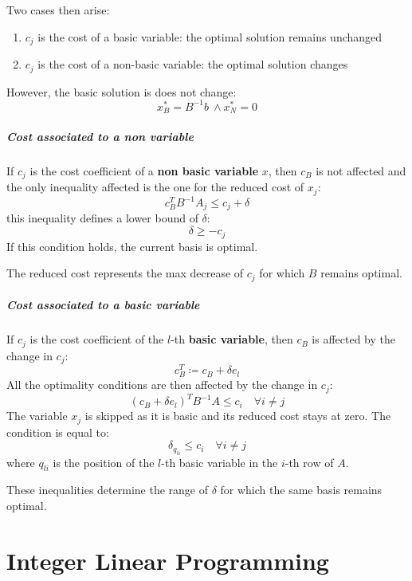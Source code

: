 \documentclass[english]{article}
\begin{document}
Two cases then arise:

\begin{enumerate}
  \item \(c_j\) is the cost of a basic variable: the optimal solution remains unchanged
  \item \(c_j\) is the cost of a non-basic variable: the optimal solution changes
\end{enumerate}

However, the basic solution is does not change:
\[ x_B^\ast = B^{-1} b \ \land x_N^\ast = 0 \]

\subparagraph*{Cost associated to a non variable}
If \(c_j\) is the cost coefficient of a \textbf{non basic variable} \(x\), then \(c_B\) is not affected and the only inequality affected is the one for the reduced cost of \(x_j\):
\[ c^T_B B^{-1} A_j \leq c_j + \delta \]
this inequality defines a lower bound of \(\delta\):
\[ \delta \geq - c_j \]
If this condition holds, the current basis is optimal.

The reduced cost represents the max decrease of \(c_j\) for which \(B\) remains optimal.

\subparagraph*{Cost associated to a basic variable}
If \(c_j\) is the cost coefficient of the \(l\)-th \textbf{basic variable}, then \(c_B\) is affected by the change in \(c_j\):
\[ c^T_B \coloneqq c_B + \delta  e_l \]
All the optimality conditions are then affected by the change in \(c_j\):
\[ \left( c_B + \delta e_l \right)^T B^{-1} A \leq c_i \quad \forall i \neq j \]
The variable \(x_j\) is skipped as it is basic and its reduced cost stays at zero.
The condition is equal to:
\[ \delta_{q_{li}} \leq c_i \quad \forall i \neq j \]
where \(q_{li}\) is the position of the \(l\)-th basic variable in the \(i\)-th row of \(A\).

These inequalities determine the range of \(\delta\) for which the same basis remains optimal.

\clearpage

\section{Integer Linear Programming}
\end{document}
